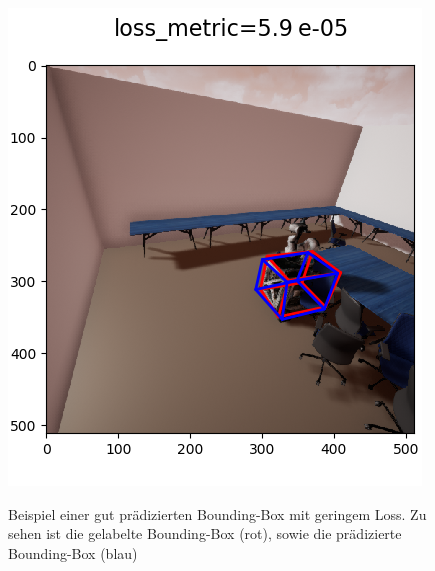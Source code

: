 \begin{figure}[!htb]
   \begin{minipage}[b]{.5\linewidth} %
      \includegraphics[width=\linewidth]{bbs/gut.png}  
      \label{tiv_ausgang}    
      \caption{Beispiel einer gut prädizierten Bounding-Box mit geringem Loss. Zu sehen ist die gelabelte Bounding-Box (rot), sowie die prädizierte Bounding-Box (blau)}
   \end{minipage}
   \hspace{.03\linewidth}%
   \begin{minipage}[b]{.5\linewidth} %

\end{minipage}
\end{figure}
